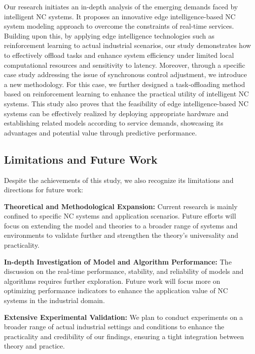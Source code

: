 \documentclass[preprint,12pt]{elsarticle}
\begin{document}
Our research initiates an in-depth analysis of the emerging demands faced by intelligent NC systems. It proposes an innovative edge intelligence-based NC system modeling approach to overcome the constraints of real-time services. Building upon this, by applying edge intelligence technologies such as reinforcement learning to actual industrial scenarios, our study demonstrates how to effectively offload tasks and enhance system efficiency under limited local computational resources and sensitivity to latency. Moreover, through a specific case study addressing the issue of synchronous control adjustment, we introduce a new methodology. For this case, we further designed a task-offloading method based on reinforcement learning to enhance the practical utility of intelligent NC systems. This study also proves that the feasibility of edge intelligence-based NC systems can be effectively realized by deploying appropriate hardware and establishing related models according to service demands, showcasing its advantages and potential value through predictive performance.

\subsection{Limitations and Future Work}

Despite the achievements of this study, we also recognize its limitations and directions for future work:

\textbf{Theoretical and Methodological Expansion:} Current research is mainly confined to specific NC systems and application scenarios. Future efforts will focus on extending the model and theories to a broader range of systems and environments to validate further and strengthen the theory's universality and practicality.

\textbf{In-depth Investigation of Model and Algorithm Performance:} The discussion on the real-time performance, stability, and reliability of models and algorithms requires further exploration. Future work will focus more on optimizing performance indicators to enhance the application value of NC systems in the industrial domain.

\textbf{Extensive Experimental Validation:} We plan to conduct experiments on a broader range of actual industrial settings and conditions to enhance the practicality and credibility of our findings, ensuring a tight integration between theory and practice.

\end{document}
